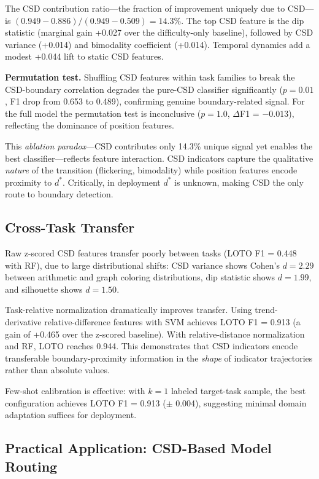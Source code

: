 \documentclass[11pt,letterpaper]{article}
\begin{document}
The CSD contribution ratio---the fraction of improvement uniquely due to CSD---is $(0.949 - 0.886)/(0.949 - 0.509) = 14.3\%$. The top CSD feature is the dip statistic (marginal gain +0.027 over the difficulty-only baseline), followed by CSD variance (+0.014) and bimodality coefficient (+0.014). Temporal dynamics add a modest +0.044 lift to static CSD features.

\textbf{Permutation test.} Shuffling CSD features within task families to break the CSD-boundary correlation degrades the pure-CSD classifier significantly ($p = 0.01$, F1 drop from 0.653 to 0.489), confirming genuine boundary-related signal. For the full model the permutation test is inconclusive ($p = 1.0$, $\Delta$F1 = $-0.013$), reflecting the dominance of position features.

This \emph{ablation paradox}---CSD contributes only 14.3\% unique signal yet enables the best classifier---reflects feature interaction. CSD indicators capture the qualitative \emph{nature} of the transition (flickering, bimodality) while position features encode proximity to $d^*$. Critically, in deployment $d^*$ is unknown, making CSD the only route to boundary detection.

\subsection{Cross-Task Transfer}
\label{sec:transfer}

Raw z-scored CSD features transfer poorly between tasks (LOTO F1 = 0.448 with RF), due to large distributional shifts: CSD variance shows Cohen's $d = 2.29$ between arithmetic and graph coloring distributions, dip statistic shows $d = 1.99$, and silhouette shows $d = 1.50$.

Task-relative normalization dramatically improves transfer. Using trend-derivative relative-difference features with SVM achieves LOTO F1 = 0.913 (a gain of +0.465 over the z-scored baseline). With relative-distance normalization and RF, LOTO reaches 0.944. This demonstrates that CSD indicators encode transferable boundary-proximity information in the \emph{shape} of indicator trajectories rather than absolute values.

Few-shot calibration is effective: with $k = 1$ labeled target-task sample, the best configuration achieves LOTO F1 = 0.913 ($\pm$ 0.004), suggesting minimal domain adaptation suffices for deployment.

\subsection{Practical Application: CSD-Based Model Routing}
\label{sec:routing}
\end{document}
